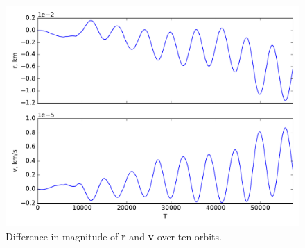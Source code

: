 \documentclass[onecolumn,10pt]{jhwhw}
\begin{document}
\begin{figure}[tbh!]
\begin{center}
\includegraphics[height=0.4\textheight]{p7-10orbits.pdf}
\end{center}
\caption{Difference in magnitude of \textbf{r} and \textbf{v} over ten orbits.}
\end{figure}




% 

\end{document}
